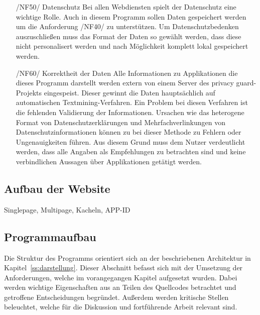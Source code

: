 \begin{itemize}
	\item[/NF50/] Datenschutz
	Bei allen Webdiensten spielt der Datenschutz eine wichtige Rolle. Auch in diesem Programm sollen Daten gespeichert werden um die Anforderung /NF40/ zu unterstützen. Um Datenschutzbedenken auszuschließen muss das Format der Daten so gewählt werden, dass diese nicht personalisert werden und nach Möglichkeit komplett lokal gespeichert werden.
	\item[/NF60/] Korrektheit der Daten
	Alle Informationen zu Applikationen die dieses Programm darstellt werden extern von einem Server des privacy guard-Projekts eingespeist. Dieser gewinnt die Daten hauptsächlich auf automatischen Textmining-Verfahren. Ein Problem bei diesen Verfahren ist die fehlenden Validierung der Informationen. Ursachen wie das heterogene Format von Datenschutzerklärungen und Mehrfachverlinkungen von Datenschutzinformationen können zu bei dieser Methode zu Fehlern oder Ungenauigkeiten führen. Aus diesem Grund muss dem Nutzer verdeutlicht werden, dass alle Angaben als Empfehlungen zu betrachten sind und keine verbindlichen Aussagen über Applikationen getätigt werden.
\end{itemize}
\subsection{Aufbau der Website}
Singlepage, Multipage, Kacheln, APP-ID
\subsection{Programmaufbau}
\label{ss:programmaufbau}
Die Struktur des Programms orientiert sich an der beschriebenen Architektur in Kapitel~\ref{ss:darstellung}. Dieser Abschnitt befasst sich mit der Umsetzung der Anforderungen, welche im vorangegangen Kapitel aufgesetzt wurden. Dabei werden wichtige Eigenschaften aus an Teilen des Quellcodes betrachtet und getroffene Entscheidungen begründet. Außerdem werden kritische Stellen beleuchtet, welche für die Diskussion und fortführende Arbeit relevant sind.




